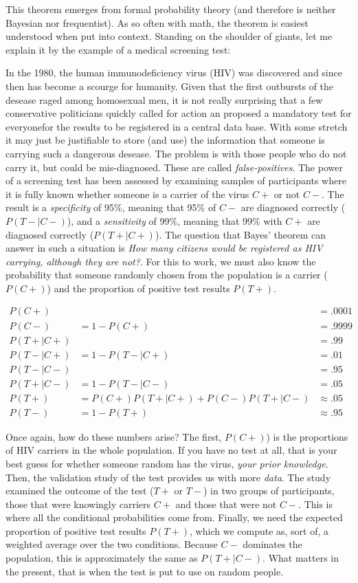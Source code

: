 \documentclass[]{svmono}
\begin{document}
This theorem emerges from formal probability theory (and therefore is
neither Bayesian nor frequentist). As so often with math, the theorem is
easiest understood when put into context. Standing on the shoulder of
giants, let me explain it by the example of a medical screening test:

In the 1980, the human immunodeficiency virus (HIV) was discovered and
since then has become a scourge for humanity. Given that the first
outbursts of the desease raged among homosexual men, it is not really
surprising that a few conservative politicians quickly called for action
an proposed a mandatory test for everyonefor the results to be
registered in a central data base. With some stretch it may just be
justifiable to store (and use) the information that someone is carrying
such a dangerous desease. The problem is with those people who do not
carry it, but could be mis-diagnosed. These are called
\emph{false-positives}. The power of a screening test has been assessed
by examining samples of participants where it is fully known whether
someone is a carrier of the virus \(C+\) or not \(C-\). The result is a
\emph{specificity} of 95\%, meaning that 95\% of \(C-\) are diagnosed
correctly (\(P(T-|C-)\)), and a \emph{sensitivity} of 99\%, meaning that
99\% with \(C+\) are diagnosed correctly (\(P(T+|C+)\)). The question
that Bayes' theorem can answer in such a situation is \emph{How many
citizens would be registered as HIV carrying, although they are not?}.
For this to work, we must also know the probability that someone
randomly chosen from the population is a carrier (\(P(C+)\)) and the
proportion of positive test results \(P(T+)\).

\[
\begin{align}
P(C+) &&= .0001\\
P(C-) &= 1 - P(C+) &= .9999\\
P(T+|C+) &&= .99\\
P(T-|C+) &= 1 - P(T-|C+) 
&= .01\\
P(T-|C-) &&= .95\\
P(T+|C-) &= 1 - P(T-|C-) 
&= .05\\
P(T+) &= P(C+)P(T+|C+) + P(C-)P(T+|C-)
&\approx .05\\
P(T-) &= 1 - P(T+) &\approx .95 
\end{align}
\]

Once again, how do these numbers arise? The first, \(P(C+)\)) is the
proportions of HIV carriers in the whole population. If you have no test
at all, that is your best guess for whether someone random has the
virus, \emph{your prior knowledge}. Then, the validation study of the
test provides us with more \emph{data}. The study examined the outcome
of the test (\(T+\) or \(T-\)) in two groups of participants, those that
were knowingly carriers \(C+\) and those that were not \(C-\). This is
where all the conditional probabilities come from. Finally, we need the
expected proportion of positive test results \(P(T+)\), which we compute
as, sort of, a weighted average over the two conditions. Because \(C-\)
dominates the population, this is approximately the same as
\(P(T+|C-)\). What matters in the present, that is when the test is put
to use on random people.
\end{document}
